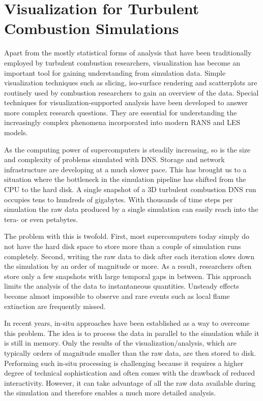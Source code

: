 \section{Visualization for Turbulent Combustion Simulations} %
\label{sec:visualization_for_turbulent_combustion_simulations}
%
Apart from the mostly statistical forms of analysis that have been traditionally
employed by turbulent combustion researchers, visualization has become an
important tool for gaining understanding from simulation data.
%
Simple visualization techniques such as slicing, iso-surface rendering and
scatterplots are routinely used by combustion researchers to gain an overview of
the data.
%
Special techniques for visualization-supported analysis have been developed to
answer more complex research questions.
%
They are essential for understanding the increasingly complex phenomena
incorporated into modern \ac{RANS} and \ac{LES} models.
%

%
As the computing power of supercomputers is steadily increasing, so is the size
and complexity of problems simulated with \ac{DNS}.
%
Storage and network infrastructure are developing at a much slower pace.
%
This has brought us to a situation where the bottleneck in the simulation
pipeline has shifted from the \ac{CPU} to the hard disk.
%
A single snapshot of a \ac{3D} turbulent combustion \ac{DNS} run occupies tens
to hundreds of gigabytes.
%
With thousands of time steps per simulation the raw data produced by a single
simulation can easily reach into the tera- or even petabytes.
%

%
The problem with this is twofold.
%
First, most supercomputers today simply do not have the hard disk space to store
more than a couple of simulation runs completely.
%
Second, writing the raw data to disk after each iteration slows down the
simulation by an order of magnitude or more.
%
As a result, researchers often store only a few snapshots with large temporal
gaps in between.
%
This approach limits the analysis of the data to instantaneous quantities.
%
Unsteady effects become almost impossible to observe and rare events such as
local flame extinction are frequently missed.
%

%
In recent years, in-situ approaches have been established as a way to overcome
this problem.
%
The idea is to process the data in parallel to the simulation while it is still
in memory.
%
Only the results of the visualization/analysis, which are typically orders of
magnitude smaller than the raw data, are then stored to disk.
%
Performing such in-situ processing is challenging because it requires a higher
degree of technical sophistication and often comes with the drawback of reduced
interactivity.
%
However, it can take advantage of all the raw data available during the
simulation and therefore enables a much more detailed analysis.
%

